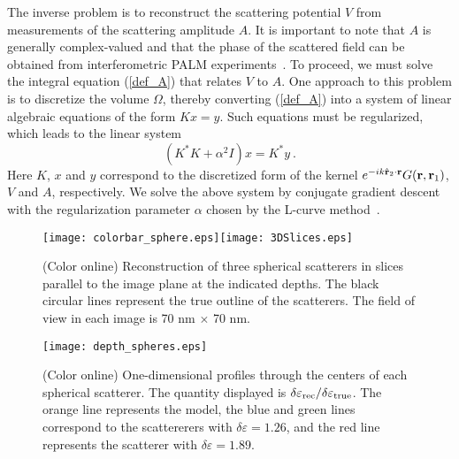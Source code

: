 \documentclass[prl,twocolumn]{revtex4-1}
\newcommand{\Br}{{\bf r}}
\begin{document}
The inverse problem is to reconstruct the scattering potential $V$ from measurements of the scattering amplitude $A$. It is important to note that $A$ is generally complex-valued and that the phase of the scattered field can be obtained from interferometric PALM experiments~\cite{Shtengel03032009,Shtengel2014273}. To proceed, we must solve the integral equation (\ref{def_A}) that relates $V$ to $A$. One approach to this problem is to discretize the volume $\Omega$, thereby converting (\ref{def_A}) into a system of linear algebraic equations of the form $Kx=y$. Such equations must be regularized, which leads to the linear system
\begin{equation}
(K^*K+\alpha^2I)x=K^*y \ .
\end{equation} 
Here $K$, $x$ and $y$ correspond to the discretized form of the kernel $e^{-ik\hat\Br_2\cdot\Br}G(\Br,\Br_1)$, $V$ and $A$, respectively.  We solve the above system by conjugate gradient descent with the regularization parameter $\alpha$ chosen by the L-curve method~\cite{hansen}. 

\begin{figure}[t]
\centering
\texttt{[image: colorbar\_sphere.eps]}\texttt{[image: 3DSlices.eps]}
\caption{(Color online) Reconstruction of three spherical scatterers in slices parallel to the image plane at the indicated depths. The black circular lines represent the true outline of the scatterers.  The field of view in each image is 70 nm $\times$ 70 nm.}
\label{fig:3Dslices}
\end{figure}

\begin{figure}[b]
\centering
\texttt{[image: depth\_spheres.eps]}
\caption{(Color online) One-dimensional profiles through the centers of each spherical scatterer.  The quantity displayed is $\delta\varepsilon_{\rm rec}/\delta\varepsilon_{\rm true}$. The orange line represents the model, the blue and green lines correspond to the scattererers with $\delta\varepsilon=1.26$, and the red line represents the scatterer with $\delta\varepsilon=1.89$.}
\label{fig:3Dcs}
\end{figure}
\end{document}

